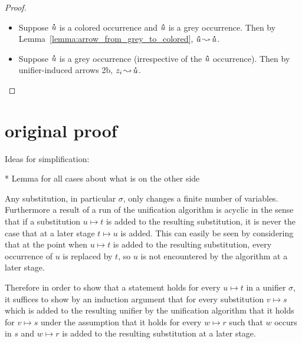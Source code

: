 \documentclass[,%
	paper=a4,%
	DIV9, %
	twoside=false,%
	liststotoc,
	bibtotoc,
	draft=false,%
	numbers=noendperiod
]{scrartcl}
\begin{document}
\begin{proof}
\begin{description}
\begin{itemize}
				\item Suppose $\bm\dot u$ is a colored occurrence and $\bm\hat u$ is a grey occurrence.
					Then by Lemma~\ref{lemma:arrow_from_grey_to_colored}, $\bm\hat u \operatorname{\leadsto} \bm\dot u$.

				\item Suppose $\bm\dot u$ is a grey occurrence (irrespective of the  $\bm\hat u$ occurrence).
					Then by unifier-induced arrows 2b, $z_i \operatorname{\leadsto} \bm\dot u$.
					\qedhere
			\end{itemize}


	\end{description}

\end{proof}




\section{original proof}

Ideas for simplification:

* Lemma for all cases about what is on the other side

\begin{remark}[\substremarksym]
	Any substitution, in particular $\sigma$, only changes a finite number of variables.
	Furthermore a result of a run of the unification algorithm is acyclic in the sense that if a substitution $u\mapsto t$ is added to the resulting substitution, it is never the case that at a later stage $t\mapsto u$ is added.
	This can easily be seen by considering that at the point when $u\mapsto t$ is added to the resulting substitution, every occurrence of $u$ is replaced by $t$, so $u$ is not encountered by the algorithm at a later stage.

	Therefore in order to show that a statement holds for every $u\mapsto t$ in a unifier $\sigma$, 
	it suffices to show by an induction argument that for every substitution $v\mapsto s$ which is added to the resulting unifier by the unification algorithm that it holds for $v\mapsto s$ under the assumption that it holds for every $w\mapsto r$ such that $w$ occurs in $s$ and $w\mapsto r$ is added to the resulting substitution at a later stage.
\end{remark}
\end{document}
